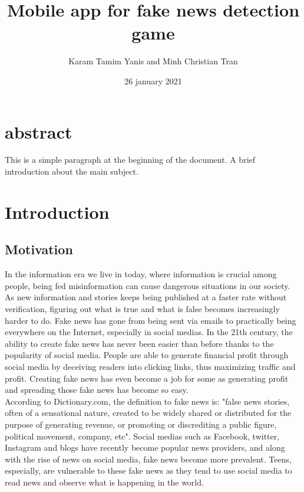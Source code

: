 \documentclass[12pt, letterpaper, twoside]{article}
\title{Mobile app for fake news detection game}
\author{Karam Tamim Yanis and Minh Christian Tran}
\date{26 january 2021}
\begin{document}
\begin{titlepage}
\maketitle
\thispagestyle{empty}%
\end{titlepage}

\section*{abstract}
This is a simple paragraph at the beginning of the 
document. A brief introduction about the main subject.
\cleardoublepage


\tableofcontents
\thispagestyle{empty}%
\cleardoublepage%

\setcounter{page}{1}%

\section{Introduction}
\subsection{Motivation}
In the information era we live in today, where information is crucial among people, being fed misinformation can cause dangerous situations in our society. As new information and stories keeps being published at a faster rate without verification, figuring out what is true and what is false becomes increasingly harder to do. Fake news has gone from being sent via emails to practically being everywhere on the Internet, especially in social medias. In the 21th century, the ability to create fake news has never been easier than before thanks to the popularity of social media. People are able to generate financial profit through social media by deceiving readers into clicking links, thus maximizing traffic and profit. Creating fake news has even become a job for some as generating profit and spreading those fake news has become so easy. \\ %

According to Dictionary.com, the definition to fake news is: "false news stories, often of a sensational nature, created to be widely shared or distributed for the purpose of generating revenue, or promoting or discrediting a public figure, political movement, company, etc". Social medias such as Facebook, twitter, Instagram and blogs have recently become popular news providers, and along with the rise of news on social media, fake news become more prevalent. Teens, especially, are vulnerable to these fake news as they tend to use social media to read news and observe what is happening in the world.\\ 
\end{document}

